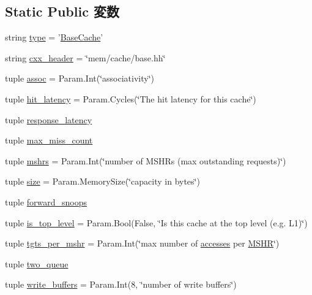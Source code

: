 \subsection*{Static Public 変数}
\begin{DoxyCompactItemize}
\item 
string \hyperlink{classBaseCache_1_1BaseCache_acce15679d830831b0bbe8ebc2a60b2ca}{type} = '\hyperlink{classBaseCache_1_1BaseCache}{BaseCache}'
\item 
string \hyperlink{classBaseCache_1_1BaseCache_a17da7064bc5c518791f0c891eff05fda}{cxx\_\-header} = \char`\"{}mem/cache/base.hh\char`\"{}
\item 
tuple \hyperlink{classBaseCache_1_1BaseCache_a19c16ab1fbe2e2d958dbfd7213149cfc}{assoc} = Param.Int(\char`\"{}associativity\char`\"{})
\item 
tuple \hyperlink{classBaseCache_1_1BaseCache_a436a0fbcd55f5b33c39cb0e4b6898d0e}{hit\_\-latency} = Param.Cycles(\char`\"{}The hit latency for this cache\char`\"{})
\item 
tuple \hyperlink{classBaseCache_1_1BaseCache_a429316ef45dd1f50afd6893d69df14ff}{response\_\-latency}
\item 
tuple \hyperlink{classBaseCache_1_1BaseCache_a51e99500c857b9a43def7df123f04211}{max\_\-miss\_\-count}
\item 
tuple \hyperlink{classBaseCache_1_1BaseCache_a9654d86897b3fa84b4ce812f955467a5}{mshrs} = Param.Int(\char`\"{}number of MSHRs (max outstanding requests)\char`\"{})
\item 
tuple \hyperlink{classBaseCache_1_1BaseCache_a377e5da8df1f89c5468c8b8cd07eac89}{size} = Param.MemorySize(\char`\"{}capacity in bytes\char`\"{})
\item 
tuple \hyperlink{classBaseCache_1_1BaseCache_a76c2c133c0ca2454e00f406cd8368eeb}{forward\_\-snoops}
\item 
tuple \hyperlink{classBaseCache_1_1BaseCache_ad7fc27036bf98b9b662ad9992833b458}{is\_\-top\_\-level} = Param.Bool(False, \char`\"{}Is this cache at the top level (e.g. L1)\char`\"{})
\item 
tuple \hyperlink{classBaseCache_1_1BaseCache_ad5c12e446f263e196690cea7686311e6}{tgts\_\-per\_\-mshr} = Param.Int(\char`\"{}max number of \hyperlink{group__CacheStatistics_gaa45ed75982de310df369d8bfa4b8896f}{accesses} per \hyperlink{classMSHR}{MSHR}\char`\"{})
\item 
tuple \hyperlink{classBaseCache_1_1BaseCache_a113d3ca0f38b0118d2e0c606bc1d742d}{two\_\-queue}
\item 
tuple \hyperlink{classBaseCache_1_1BaseCache_a890200fe0ea63598dec56b553da3bfb1}{write\_\-buffers} = Param.Int(8, \char`\"{}number of write buffers\char`\"{})

\end{DoxyCompactItemize}
